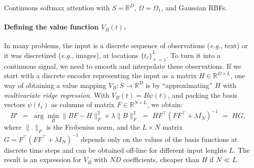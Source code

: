 \documentclass{article}
\newcommand{\andre}[1]{{\textcolor{blue}{\bf [{\sc Andre:} #1]}}}
\begin{document}
\begin{algorithm}[t]
\begin{comment}
\item Ridge penalty $\lambda \ge 0$
\end{itemize}
}
\KwOutput{Continuous representation $V_B(t) = B\psi(t)$ with $B \in \mathbb{R}^{D \times N}$}
\vspace{\algspace}
\Fn{\FRegression{$H, t_{1:L}, \lambda$}}{
    $F \leftarrow [\psi(t_1), \ldots, \psi(t_L)]$\\
    $G \leftarrow F^\top (FF^\top + \lambda I_N)^{-1}$\\
    $B \leftarrow HG$\\
    \KwRet{$B$\hfill \tcp*[h]{Eq.\,\eqref{eq:gamma}}}
}
\end{comment}
\caption{Continuous softmax attention with $S=\mathbb{R}^D$, $\Omega=\Omega_1$, and Gaussian RBFs.\label{algo:forward_backward_gaussian}}
\end{algorithm}

 
\begin{comment}
On the other hand, for $S = \mathbb{R}$ and $\phi(t) = [t, t^2]$, we obtain new attention mechanisms (assessed experimentally in \S\ref{sec:experiments}): for $\alpha=1$, the underlying density $p$ is Gaussian, and for $\alpha=2$, it is a truncated parabola (see \S\ref{sec:sparsemax}). In both cases, we show (App.~\ref{sec:gaussian_basis}) that the expectation \eqref{eq:attention_expectation} is tractable if 
$\psi$ are Gaussian RBFs, and we use this fact in \S\ref{sec:experiments}. 
\andre{say something about the 2D case} 
\end{comment}

\paragraph{Defining the value function $V_B(t)$.}
In many problems, the input is a discrete sequence of observations (\textit{e.g.}, text) or it was discretized (\textit{e.g.}, images), at locations $\{t_\ell\}_{\ell=1}^L$. To turn it into a continuous signal, we need to smooth and interpolate these observations. If we start with a  discrete encoder representing the input as a matrix $H \in \mathbb{R}^{D \times L}$, one way of obtaining a value mapping $V_B: S \rightarrow \mathbb{R}^D$ is by ``approximating'' $H$ with {\it multivariate ridge regression}. With  $V_B(t) = B \psi(t)$, and packing the basis vectors $\psi(t_\ell)$ as columns of matrix $F \in \mathbb{R}^{N\times L}$, we obtain: \begin{equation}\label{eq:B_regression}
    B^\star \,\,=\,\, \arg\min_B \|BF - H\|_F^2 + \lambda \|B\|_F^2 \,\,=\,\,  HF^\top (FF^\top + \lambda I_N)^{-1} \,\,=\,\, HG,
\end{equation}
where $\|.\|_F$ is the Frobenius norm, and
the $L\times N$ matrix $G = F^\top (FF^\top + \lambda I_N)^{-1}$ depends only on the values of the basis functions at discrete time steps and can be obtained off-line for different input lenghts $L$.
The result is an expression for $V_B$ with $ND$ coefficients, cheaper than $H$ if $N \ll L$. 
\end{document}
